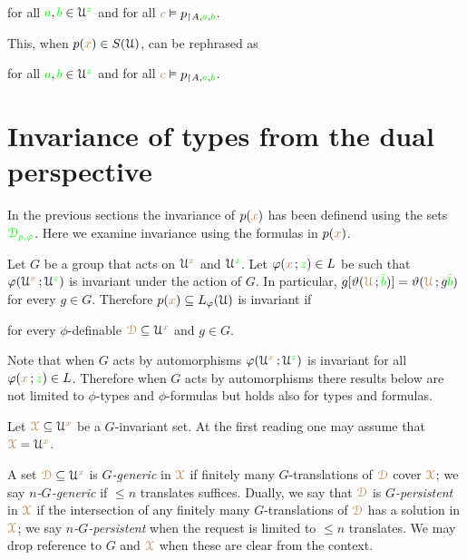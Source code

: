 \hfill for all ${\color{green} a},{\color{green} b}\in\EuScript U^{\color{green} z}$ and for all ${\color{brown} c}\vDash p_{\restriction A,{\color{green} a},{\color{green} b}}$.

This, when $p({\color{brown} x})\in S(\EuScript U)$, can be rephrased as

\hfill for all ${\color{green} a},{\color{green} b}\in\EuScript U^{\color{green} z}$ and for all ${\color{brown} c}\vDash p_{\restriction A,{\color{green} a},{\color{green} b}}$.

\section{Invariance of types from the dual perspective}\label{dual_perspective}


In the previous sections the invariance of $p({\color{brown} x})$ has been definend using the sets ${\color{green}\EuScript D_{p,\varphi}}$.
Here we examine invariance using the formulas in $p({\color{brown} x})$.

Let $G$ be a group that acts on $\EuScript U^{\color{brown} x}$ and $\EuScript U^{\color{green} z}$.
Let $\varphi({\color{brown} x}\,;{\color{green} z})\in L$ be such that $\varphi(\EuScript U^{\color{brown} x}\,;\EuScript U^{\color{green} z})$ is invariant under the action of $G$.
In particular, $g[\vartheta({\color{brown}\EuScript U}\,;{\color{green}\bar b})]=\vartheta({\color{brown}\EuScript U}\,;g{\color{green}\bar b})$ for every $g\in G$.
Therefore $p({\color{brown} x})\subseteq L_\varphi(\EuScript U)$ is invariant if

\hfill for every $\phi$-definable ${\color{brown}\EuScript D}\subseteq\EuScript U^{\color{brown} x}$ and $g\in G$.

Note that when $G$ acts by automorphisms $\varphi(\EuScript U^{\color{brown} x}\,;\EuScript U^{\color{green} z})$ is invariant for all $\varphi({\color{brown} x}\,;{\color{green} z})\in L$.
Therefore when $G$ acts by automorphisms there results below are not limited to $\phi$-types and $\phi$-formulas but holds also for types and formulas.

Let ${\color{brown}\EuScript X}\subseteq\EuScript U^{\color{brown} x}$ be a $G$-invariant set.
At the first reading one may assume that ${\color{brown}\EuScript X}=\EuScript U^{\color{brown} x}$.%

A set ${\color{brown}\EuScript D}\subseteq\EuScript U^{\color{brown} x}$ is \emph{$G$-generic\/} in ${\color{brown}\EuScript X}$ if finitely many $G$-translations of ${\color{brown}\EuScript D}$ cover ${\color{brown}\EuScript X}$; we say \emph{$n$-$G$-generic\/} if $\le n$ translates suffices.
Dually, we say that ${\color{brown}\EuScript D}$ is \emph{$G$-persistent\/} in ${\color{brown}\EuScript X}$ if the intersection of any finitely many $G$-translations of ${\color{brown}\EuScript D}$ has a solution in ${\color{brown}\EuScript X}$; we say \emph{$n$-$G$-persistent\/} when the request is limited to $\le n$ translates.
We may drop reference to $G$ and ${\color{brown}\EuScript X}$ when these are clear from the context.

